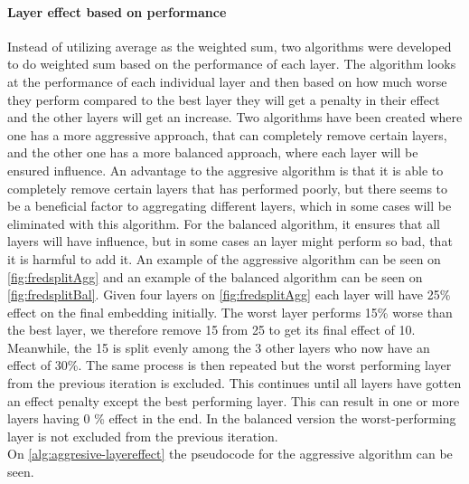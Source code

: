 \paragraph{Layer effect based on performance} \label{fredsplit}
Instead of utilizing average as the weighted sum, two algorithms were developed to do weighted sum based on the performance of each layer.
The algorithm looks at the performance of each individual layer and then based on how much worse they perform compared to the best layer they will get a penalty in their effect and the other layers will get an increase.
Two algorithms have been created where one has a more aggressive approach, that can completely remove certain layers, and the other one has a more balanced approach, where each layer will be ensured influence.
An advantage to the aggresive algorithm is that it is able to completely remove certain layers that has performed poorly, but there seems to be a beneficial factor to aggregating different layers, which in some cases will be eliminated with this algorithm.
For the balanced algorithm, it ensures that all layers will have influence, but in some cases an layer might perform so bad, that it is harmful to add it.
An example of the aggressive algorithm can be seen on \autoref{fig:fredsplitAgg} and an example of the balanced algorithm can be seen on \autoref{fig:fredsplitBal}.
Given four layers on \autoref{fig:fredsplitAgg} each layer will have 25\% effect on the final embedding initially.
The worst layer performs 15\% worse than the best layer, we therefore remove 15 from 25 to get its final effect of 10.
Meanwhile, the 15 is split evenly among the 3 other layers who now have an effect of 30\%.
The same process is then repeated but the worst performing layer from the previous iteration is excluded.
This continues until all layers have gotten an effect penalty except the best performing layer.
This can result in one or more layers having 0 \% effect in the end.
In the balanced version the worst-performing layer is not excluded from the previous iteration.
\\
On \autoref{alg:aggresive-layereffect} the pseudocode for the aggressive algorithm can be seen.
